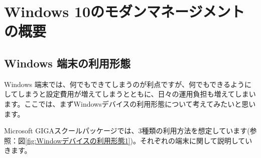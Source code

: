 \chapter{Windows 10のモダンマネージメントの概要}

\section{Windows 端末の利用形態}

Windows 端末では、何でもできてしまうのが利点ですが、何でもできるようにしてしまうと設定費用が増えてしまうとともに、日々の運用負担も増えてしまいます。ここでは、まずWindowsデバイスの利用形態について考えてみたいと思います。

Microsoft GIGAスクールパッケージでは、3種類の利用方法を想定しています(参照：図\ref{fig:Windowデバイスの利用形態1})。それぞれの端末に関して説明していきます。

